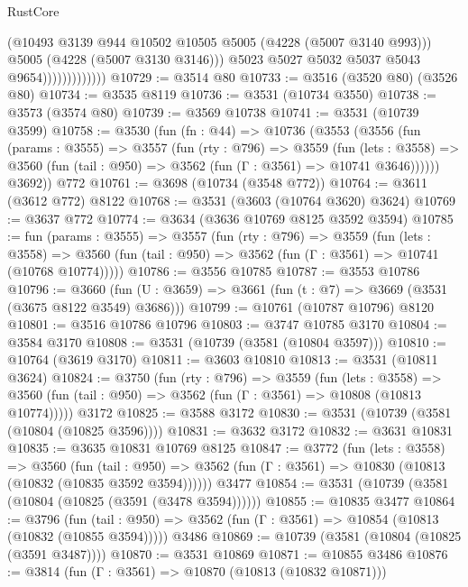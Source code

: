 \begin{lexlean}{RustCore}
\begin{coremodule}
                                (@10493 @3139 @944 @10502 @10505 @5005 (@4228 (@5007 @3140 @993)))
                                @5005
                                (@4228 (@5007 @3130 @3146)))
                              @5023
                              @5027
                              @5032
                              @5037
                              @5043
                              @9654)))))))))))))
@10729 := @3514 @80
@10733 := @3516 (@3520 @80) (@3526 @80)
@10734 := @3535 @8119
@10736 := @3531 (@10734 @3550)
@10738 := @3573 (@3574 @80)
@10739 := @3569 @10738
@10741 := @3531 (@10739 @3599)
@10758 := @3530
    (fun (fn : @44) =>
    @10736
      (@3553
        (@3556
          (fun (params : @3555) =>
          @3557
            (fun (rty : @796) =>
            @3559
              (fun (lets : @3558) =>
              @3560 (fun (tail : @950) => @3562 (fun (Γ : @3561) => @10741 @3646))))))
        @3692))
    @772
@10761 := @3698 (@10734 (@3548 @772))
@10764 := @3611 (@3612 @772) @8122
@10768 := @3531 (@3603 (@10764 @3620) @3624)
@10769 := @3637 @772
@10774 := @3634 (@3636 @10769 @8125 @3592 @3594)
@10785 := fun (params : @3555) =>
  @3557
    (fun (rty : @796) =>
    @3559
      (fun (lets : @3558) =>
      @3560 (fun (tail : @950) => @3562 (fun (Γ : @3561) => @10741 (@10768 @10774)))))
@10786 := @3556 @10785
@10787 := @3553 @10786
@10796 := @3660 (fun (U : @3659) => @3661 (fun (t : @7) => @3669 (@3531 (@3675 @8122 @3549) @3686)))
@10799 := @10761 (@10787 @10796) @8120
@10801 := @3516 @10786 @10796
@10803 := @3747 @10785 @3170
@10804 := @3584 @3170
@10808 := @3531 (@10739 (@3581 (@10804 @3597)))
@10810 := @10764 (@3619 @3170)
@10811 := @3603 @10810
@10813 := @3531 (@10811 @3624)
@10824 := @3750
    (fun (rty : @796) =>
    @3559
      (fun (lets : @3558) =>
      @3560 (fun (tail : @950) => @3562 (fun (Γ : @3561) => @10808 (@10813 @10774)))))
    @3172
@10825 := @3588 @3172
@10830 := @3531 (@10739 (@3581 (@10804 (@10825 @3596))))
@10831 := @3632 @3172
@10832 := @3631 @10831
@10835 := @3635 @10831 @10769 @8125
@10847 := @3772
    (fun (lets : @3558) =>
    @3560
      (fun (tail : @950) =>
      @3562 (fun (Γ : @3561) => @10830 (@10813 (@10832 (@10835 @3592 @3594))))))
    @3477
@10854 := @3531 (@10739 (@3581 (@10804 (@10825 (@3591 (@3478 @3594))))))
@10855 := @10835 @3477
@10864 := @3796
    (fun (tail : @950) => @3562 (fun (Γ : @3561) => @10854 (@10813 (@10832 (@10855 @3594)))))
    @3486
@10869 := @10739 (@3581 (@10804 (@10825 (@3591 @3487))))
@10870 := @3531 @10869
@10871 := @10855 @3486
@10876 := @3814 (fun (Γ : @3561) => @10870 (@10813 (@10832 @10871)))

\end{coremodule}
\end{lexlean}
